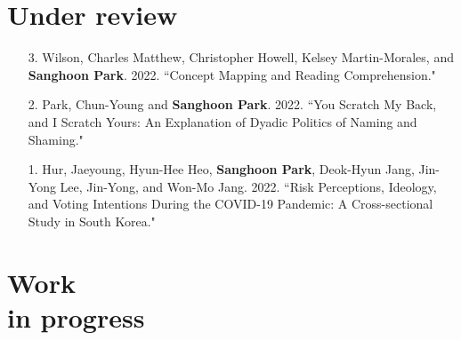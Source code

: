 \documentclass[margin,line]{res}
\begin{document}
\begin{resume}
\section{\sc Under review}
\begin{enumerate}[leftmargin=*]
\item[3.] Wilson, Charles Matthew, Christopher Howell, Kelsey Martin-Morales, and \textbf{Sanghoon Park}. 2022. ``Concept Mapping and Reading Comprehension."
\item[2.] Park, Chun-Young and \textbf{Sanghoon Park}. 2022. ``You Scratch My Back, and I Scratch Yours: An Explanation of Dyadic Politics of Naming and Shaming."
\item[1.] Hur, Jaeyoung, Hyun-Hee Heo, \textbf{Sanghoon Park}, Deok-Hyun Jang, Jin-Yong Lee, Jin-Yong, and Won-Mo Jang. 2022. ``Risk Perceptions, Ideology, and Voting Intentions During the COVID-19 Pandemic: A Cross-sectional Study in South Korea."
\end{enumerate}



\section{\sc Work\\in progress}


\end{resume}
\end{document}
